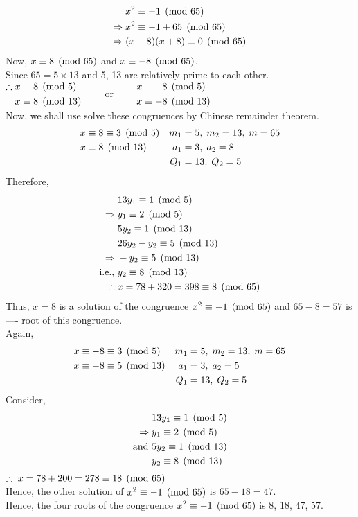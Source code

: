 \documentclass[12pt,class=book,crop=false]{standalone}
\begin{document}
\begin{soln}
    \hfill
    \begin{align*}
        &x^2\equiv -1 \pmod{65}\\
        \Rightarrow\;&x^2\equiv -1+65 \pmod{65}\\
        \Rightarrow\;&(x-8)(x+8)\equiv 0 \pmod{65}\\
    \end{align*}
    Now, $ x\equiv 8 \pmod{65} $ and $ x\equiv -8 \pmod{65} $.\\
    Since $ 65=5\times 13 $ and 5, 13 are relatively prime to each other.\\
    $ \begin{aligned}
        \therefore\;&x\equiv 8 \pmod{5}\\
        &x\equiv 8 \pmod{13}\qquad
    \end{aligned} $ or $ \begin{aligned}
       \qquad &x\equiv -8 \pmod{5}\\
        &x\equiv -8 \pmod{13}
    \end{aligned} $\\
    Now, we shall use solve these congruences by Chinese remainder theorem.
    \begin{align*}
        &x\equiv 8\equiv 3 \pmod{5}&m_1&=5,\;m_2=13,\;m=65\\
        &x\equiv 8 \pmod{13}&a_1&=3,\;a_2=8\\
        &&Q_1&=13,\;Q_2=5
    \end{align*}
    Therefore,
    \begin{align*}
        &13y_1\equiv 1 \pmod{5}\\
        \Rightarrow\;&y_1\equiv 2 \pmod{5}\\
        &5y_2\equiv 1 \pmod{13}\\
        &26y_2-y_2\equiv 5 \pmod{13}\\
        \Rightarrow\;&-y_2\equiv 5 \pmod{13}\\
        \text{i.e., }&y_2\equiv 8 \pmod{13}\\
        \therefore\;&x=78+320=398\equiv 8 \pmod{65}
    \end{align*}
    Thus, $ x=8 $ is a solution of the congruence $ x^2\equiv -1 \pmod{65} $ and $ 65-8=57 $ is ---- root of this congruence.\\

    Again, 
    \begin{align*}
        &x\equiv -8\equiv 3 \pmod{5}&m_1&=5,\;m_2=13,\;m=65\\
        &x\equiv -8\equiv 5 \pmod{13}&a_1&=3,\;a_2=5\\
        &&Q_1&=13,\;Q_2=5
    \end{align*}
    Consider, 
    \begin{align*}
        &13y_1\equiv 1 \pmod{5}\\
        \Rightarrow\;&y_1\equiv 2 \pmod{5}\\
        \text{and }&5y_2\equiv 1 \pmod{13}\\
        &y_2\equiv 8 \pmod{13}\\
    \end{align*}
    $\therefore\;x=78+200=278\equiv 18 \pmod{65}$\\
    Hence, the other solution of $ x^2\equiv -1 \pmod{65} $ is $ 65-18=47 $.\\
    Hence, the four roots of the congruence $ x^2\equiv -1 \pmod{65} $ is 8, 18, 47, 57.
\end{soln}
\end{document}

